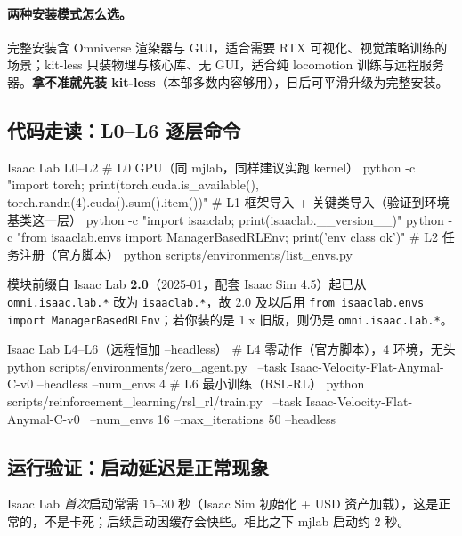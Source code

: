 \paragraph{两种安装模式怎么选。}完整安装含 Omniverse 渲染器与 GUI，适合需要 RTX 可视化、视觉策略训练的场景；kit-less 只装物理与核心库、无 GUI，适合纯 locomotion 训练与远程服务器。\textbf{拿不准就先装 kit-less}（本部多数内容够用），日后可平滑升级为完整安装。

\subsection{代码走读：L0--L6 逐层命令}

\begin{codebox}[bash]{Isaac Lab L0--L2}
# L0 GPU（同 mjlab，同样建议实跑 kernel）
python -c "import torch; print(torch.cuda.is_available(), torch.randn(4).cuda().sum().item())"
# L1 框架导入 + 关键类导入（验证到环境基类这一层）
python -c "import isaaclab; print(isaaclab.__version__)"
python -c "from isaaclab.envs import ManagerBasedRLEnv; print('env class ok')"
# L2 任务注册（官方脚本）
python scripts/environments/list_envs.py
\end{codebox}
模块前缀自 Isaac Lab \textbf{2.0}（2025-01，配套 Isaac Sim 4.5）起已从 \texttt{omni.\allowbreak isaac.\allowbreak lab.*} 改为 \texttt{isaaclab.*}，故 2.0 及以后用 \texttt{from isaaclab.\allowbreak envs import ManagerBasedRLEnv}；若你装的是 1.x 旧版，则仍是 \texttt{omni.\allowbreak isaac.\allowbreak lab.*}。

\begin{codebox}[bash]{Isaac Lab L4--L6（远程恒加 --headless）}
# L4 零动作（官方脚本），4 环境，无头
python scripts/environments/zero_agent.py \
    --task Isaac-Velocity-Flat-Anymal-C-v0 --headless --num_envs 4
# L6 最小训练（RSL-RL）
python scripts/reinforcement_learning/rsl_rl/train.py \
    --task Isaac-Velocity-Flat-Anymal-C-v0 \
    --num_envs 16 --max_iterations 50 --headless
\end{codebox}

\subsection{运行验证：启动延迟是正常现象}

Isaac Lab \emph{首次}启动常需 15--30 秒（Isaac Sim 初始化 + USD 资产加载），这是正常的，不是卡死；后续启动因缓存会快些。相比之下 mjlab 启动约 2 秒。


